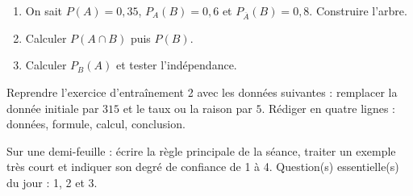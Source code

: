 \begin{exercice}[-- essentiel]
\begin{enumerate}\item On sait $P(A)=0{,}35$, $P_A(B)=0{,}6$ et $P_{\overline A}(B)=0{,}8$. Construire l'arbre.\item Calculer $P(A\cap B)$ puis $P(B)$.\item Calculer $P_B(A)$ et tester l'indépendance.\end{enumerate}
\end{exercice}


\begin{dm}Reprendre l'exercice d'entraînement 2 avec les données suivantes : remplacer la donnée initiale par $315$ et le taux ou la raison par $5$. Rédiger en quatre lignes : données, formule, calcul, conclusion.\end{dm}

\begin{sortie}Sur une demi-feuille : écrire la règle principale de la séance, traiter un exemple très court et indiquer son degré de confiance de 1 à 4. Question(s) essentielle(s) du jour : 1, 2 et 3.\end{sortie}

